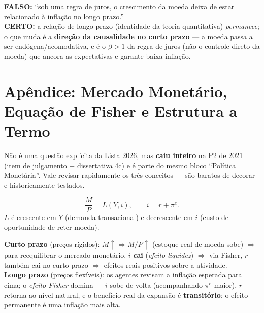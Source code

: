 \documentclass[12pt, a4paper]{article}
\begin{document}
\begin{armbox}[title={Armadilha conceitual}]
\textbf{FALSO:} ``sob uma regra de juros, o crescimento da moeda deixa de
estar relacionado à inflação no longo prazo.'' \\
\textbf{CERTO:} a relação de longo prazo (identidade da teoria quantitativa)
\emph{permanece}; o que muda é a \textbf{direção da causalidade no curto
prazo} --- a moeda passa a ser endógena/acomodativa, e é o $\beta>1$ da regra
de juros (não o controle direto da moeda) que ancora as expectativas e
garante baixa inflação.
\end{armbox}

\section{Apêndice: Mercado Monetário, Equação de Fisher e Estrutura a Termo}

\begin{provabox}[title={Por que este apêndice, se não está na Lista 2026?}]
Não é uma questão explícita da Lista 2026, mas \textbf{caiu inteiro} na P2 de
2021 (item de julgamento + dissertativa 4c) e é parte do mesmo bloco
``Política Monetária''. Vale revisar rapidamente os três conceitos --- são
baratos de decorar e historicamente testados.
\end{provabox}

\begin{formulabox}[title={Equilíbrio do mercado monetário e equação de Fisher}]
\[
  \frac{M}{P} = L(Y,i), \qquad i = r + \pi^{e}.
\]
$L$ é crescente em $Y$ (demanda transacional) e decrescente em $i$ (custo de
oportunidade de reter moeda).
\end{formulabox}

\begin{fatorbox}[title={Efeitos de uma expansão monetária: curto vs.\ longo prazo}]
\textbf{Curto prazo} (preços rígidos): $M\uparrow \Rightarrow M/P\uparrow$
(estoque real de moeda sobe) $\Rightarrow$ para reequilibrar o mercado
monetário, $i$ \textbf{cai} (\emph{efeito liquidez}) $\Rightarrow$ via Fisher,
$r$ também cai no curto prazo $\Rightarrow$ efeitos reais positivos sobre a
atividade. \\
\textbf{Longo prazo} (preços flexíveis): os agentes revisam a inflação
esperada para cima; o \emph{efeito Fisher} domina --- $i$ sobe de volta
(acompanhando $\pi^e$ maior), $r$ retorna ao nível natural, e o benefício
real da expansão é \textbf{transitório}; o efeito permanente é uma inflação
mais alta.
\end{fatorbox}
\end{document}
